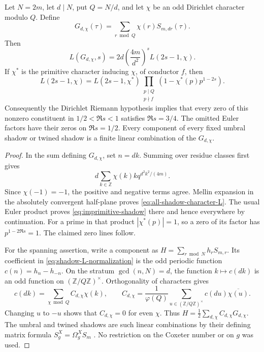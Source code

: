 \begin{theorem}\label{thm:all-shadow-characters}
Let $N=2m$, let $d\mid N$, put $Q=N/d$, and let $\chi$ be an odd Dirichlet
character modulo $Q$.  Define
\[
 G_{d,\chi}(\tau)=\sum_{r\bmod Q}\chi(r)S_{m,dr}(\tau).
\]
Then
\begin{equation}\label{eq:all-shadow-character-L}
 L(G_{d,\chi},s)=2d\left(\frac{4m}{d^2}\right)^sL(2s-1,\chi).
\end{equation}
If $\chi^*$ is the primitive character inducing $\chi$, of conductor $f$, then
\begin{equation}\label{eq:imprimitive-shadow}
 L(2s-1,\chi)=L(2s-1,\chi^*)
 \prod_{\substack{p\mid Q\\p\nmid f}}
       \left(1-\chi^*(p)p^{1-2s}\right).
\end{equation}
Consequently the Dirichlet Riemann hypothesis implies that every zero of
this nonzero constituent in $1/2<\Re s<1$ satisfies $\Re s=3/4$.
The omitted Euler factors have their zeros on $\Re s=1/2$.
Every component of every fixed umbral shadow or twined shadow is a finite
linear combination of the $G_{d,\chi}$.
\end{theorem}
\begin{proof}
In the sum defining $G_{d,\chi}$, set $n=dk$.  Summing over residue classes
first gives
\[d\sum_{k\in\mathbb Z}\chi(k)kq^{d^2k^2/(4m)}.\]
Since $\chi(-1)=-1$, the positive and negative terms agree.  Mellin expansion
in the absolutely convergent half-plane proves
\eqref{eq:all-shadow-character-L}.  The usual Euler product proves
\eqref{eq:imprimitive-shadow} there and hence everywhere by continuation.
For a prime in that product $|\chi^*(p)|=1$, so a zero of its factor has
$p^{1-2\Re s}=1$.  The claimed zero lines follow.

For the spanning assertion, write a component as
$H=\sum_{r\bmod N}h_rS_{m,r}$.  Its coefficient in
\eqref{eq:shadow-L-normalization} is the odd periodic function
$c(n)=h_n-h_{-n}$.  On the stratum $\gcd(n,N)=d$, the function $k\mapsto c(dk)$
is an odd function on $(\mathbb Z/Q\mathbb Z)^\times$.  Orthogonality of
characters gives
\begin{equation}\label{eq:character-stratum-coefficients}
 c(dk)=\sum_{\chi\bmod Q}C_{d,\chi}\chi(k),\qquad
 C_{d,\chi}=\frac1{\varphi(Q)}
    \sum_{u\in(\mathbb Z/Q\mathbb Z)^\times}c(du)\overline{\chi(u)}.
\end{equation}
Changing $u$ to $-u$ shows that $C_{d,\chi}=0$ for even $\chi$.
Thus $H=\frac12\sum_{d,\chi}C_{d,\chi}G_{d,\chi}$.
The umbral and twined shadows are such linear combinations by their defining
matrix formula $S_g^X=\Omega_g^XS_m$
\cite[Sect.~4.1 and Sect.~5.1]{CDH2014}.  No restriction on the Coxeter number or on
$g$ was used.
\end{proof}

